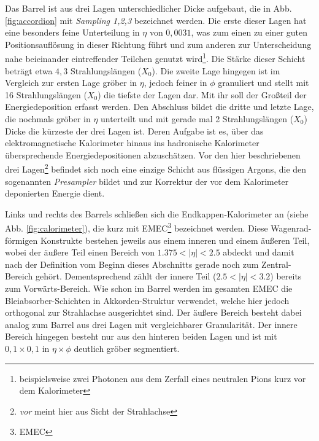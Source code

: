 Das Barrel ist aus drei Lagen unterschiedlicher Dicke aufgebaut, die in Abb.
\ref{fig:accordion} mit \textit{Sampling 1,2,3} bezeichnet werden. Die erste
dieser Lagen hat eine besonders feine Unterteilung in $\eta$ von $0,0031$, was
zum einen zu einer guten Positionsauflösung in dieser Richtung führt und zum
anderen zur Unterscheidung nahe beieinander eintreffender Teilchen genutzt
wird\footnote{beispielsweise zwei Photonen aus dem Zerfall eines neutralen
Pions kurz vor dem Kalorimeter}. Die Stärke dieser Schicht beträgt etwa $4,3$
Strahlungslängen ($X_0$). Die zweite Lage hingegen ist im Vergleich zur ersten
Lage gröber in $\eta$, jedoch feiner in $\phi$ granuliert und stellt mit 16
Strahlungslängen ($X_0$) die tiefste der Lagen dar. Mit ihr soll der Großteil
der Energiedeposition erfasst werden. Den Abschluss bildet die dritte und
letzte Lage, die nochmals gröber in $\eta$ unterteilt und mit gerade mal 2
Strahlungslängen ($X_0$) Dicke die kürzeste der drei Lagen ist. Deren Aufgabe
ist es, über das elektromagnetische Kalorimeter hinaus ins hadronische
Kalorimeter übersprechende Energiedepositionen abzuschätzen. Vor den hier
beschriebenen drei Lagen\footnote{\textit{vor} meint hier aus Sicht der
Strahlachse} befindet sich noch eine einzige Schicht aus flüssigen Argons, die
den sogenannten \textit{Presampler} bildet und zur Korrektur der vor dem
Kalorimeter deponierten Energie dient.

Links und rechts des Barrels schließen sich die Endkappen-Kalorimeter an (siehe
Abb. \ref{fig:calorimeter}), die kurz mit EMEC\footnote{\acf{EMEC}} bezeichnet
werden. Diese Wagenrad-förmigen Konstrukte bestehen jeweils aus einem inneren
und einem äußeren Teil, wobei der äußere Teil einen Bereich von
$1.375<|\eta|<2.5$ abdeckt und damit nach der Definition vom Beginn dieses
Abschnitts gerade noch zum Zentral-Bereich gehört. Dementsprechend zählt der
innere Teil ($2.5<|\eta|<3.2$) bereits zum Vorwärts-Bereich. Wie schon im
Barrel werden im gesamten \ac{EMEC} die Bleiabsorber-Schichten in
Akkorden-Struktur verwendet, welche hier jedoch orthogonal zur Strahlachse
ausgerichtet sind. Der äußere Bereich besteht dabei analog zum Barrel aus drei
Lagen mit vergleichbarer Granularität. Der innere Bereich hingegen besteht nur
aus den hinteren beiden Lagen  und ist mit $0,1\times0,1$ in $\eta\times\phi$
deutlich gröber segmentiert.


